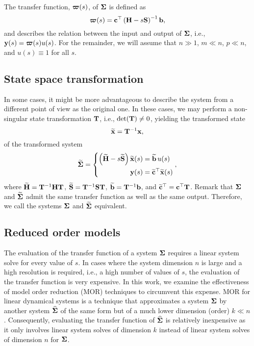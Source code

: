 The transfer function, $\boldsymbol{\varpi}(s)$, of $\mathbf{\Sigma}$ is defined as
\begin{equation}
  \boldsymbol{\varpi}(s) = \mathbf{c}^\top \left( \mathbf{H} - s\mathbf{S} \right)^{-1} \mathbf{b},
  \label{eq:siso-tf}
\end{equation}
and describes the relation between the input and output of $\mathbf{\Sigma}$, i.e., $\mathbf{y}(s) = \boldsymbol{\varpi}(s) u(s)$. For the remainder, we will assume that $n \gg 1$, $m \ll n$, $p \ll n$, and $u(s) \equiv 1$ for all $s$.

\subsection{State space transformation}
\label{lds:ss-transf}

In some cases, it might be more advantageous to describe the system from a different point of view as the original one. In these cases, we may perform a non-singular state transformation $\mathbf{T}$, i.e., $\det(\mathbf{T}) \neq 0$, yielding the transformed state
\begin{equation}
  \widetilde{\mathbf{x}} = \mathbf{T}^{-1} \mathbf{x},
  \label{eq:defxtil}
\end{equation}
of the transformed system
\begin{equation}
  \widetilde{\mathbf{\Sigma}} = \left\{\begin{aligned}
    \left( \widetilde{\mathbf{H}} - s\widetilde{\mathbf{S}} \right) \widetilde{\mathbf{x}}(s) &= \widetilde{\mathbf{b}}\,u(s) \\
                                 \mathbf{y}(s) &= \widetilde{\mathbf{c}}^\top \widetilde{\mathbf{x}}(s)
  \end{aligned}\right.,
\end{equation}
where $\widetilde{\mathbf{H}} = \mathbf{T}^{-1} \mathbf{H} \mathbf{T}$, $\widetilde{\mathbf{S}} = \mathbf{T}^{-1} \mathbf{S} \mathbf{T}$, $\widetilde{\mathbf{b}} = \mathbf{T}^{-1} \mathbf{b}$, and $\widetilde{\mathbf{c}}^\top = \mathbf{c}^\top \mathbf{T}$. Remark that $\mathbf{\Sigma}$ and $\widetilde{\mathbf{\Sigma}}$ admit the same transfer function as well as the same output. Therefore, we call the systems $\mathbf{\Sigma}$ and $\widetilde{\mathbf{\Sigma}}$ equivalent.

\subsection{Reduced order models}
\label{lds:mor}

The evaluation of the transfer function of a system $\mathbf{\Sigma}$ requires a linear system solve for every value of $s$. In cases where the system dimension $n$ is large and a high resolution is required, i.e., a high number of values of $s$, the evaluation of the transfer function is very expensive. In this work, we examine the effectiveness of model order reduction (MOR) techniques to circumvent this expense. MOR for linear dynamical systems is a technique that approximates a system $\mathbf{\Sigma}$ by another system $\widehat{\mathbf{\Sigma}}$ of the same form but of a much lower dimension (order) $k \ll n$. Consequently, evaluating the transfer function of $\widehat{\mathbf{\Sigma}}$ is relatively inexpensive as it only involves linear system solves of dimension $k$ instead of linear system solves of dimension $n$ for $\mathbf{\Sigma}$.

